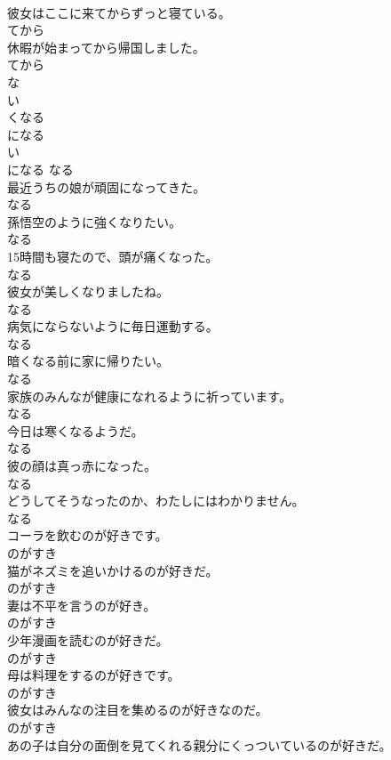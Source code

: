 \documentclass[8pt]{extreport}
\begin{document}
\begin{CJK}{UTF8}{min}
\\	彼女はここに来てからずっと寝ている。	
\\	てから
\\	休暇が始まってから帰国しました。	
\\	てから
\\	な
\\	い 
\\	くなる	
\\	になる	
\\	い
\\	になる	なる
\\	最近うちの娘が頑固になってきた。	
\\	なる
\\	孫悟空のように強くなりたい。	
\\	なる
\\	15時間も寝たので、頭が痛くなった。	
\\	なる
\\	彼女が美しくなりましたね。	
\\	なる
\\	病気にならないように毎日運動する。	
\\	なる
\\	暗くなる前に家に帰りたい。	
\\	なる
\\	家族のみんなが健康になれるように祈っています。	
\\	なる
\\	今日は寒くなるようだ。	
\\	なる
\\	彼の顔は真っ赤になった。	
\\	なる
\\	どうしてそうなったのか、わたしにはわかりません。	
\\	なる
\\	コーラを飲むのが好きです。	
\\	のがすき
\\	猫がネズミを追いかけるのが好きだ。	
\\	のがすき
\\	妻は不平を言うのが好き。	
\\	のがすき
\\	少年漫画を読むのが好きだ。	
\\	のがすき
\\	母は料理をするのが好きです。	
\\	のがすき
\\	彼女はみんなの注目を集めるのが好きなのだ。	
\\	のがすき
\\	あの子は自分の面倒を見てくれる親分にくっついているのが好きだ。	

\end{CJK}
\end{document}
